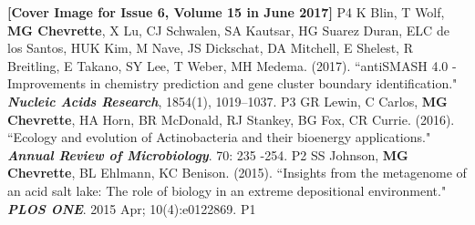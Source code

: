 \begin{cvpubs}
{	\linebreak \textbf{[Cover Image for Issue 6, Volume 15 in June 2017]}    
    } %
    {P4} %
  \cvpub
    {K Blin, T Wolf, \textbf{MG Chevrette}, X Lu, CJ Schwalen, SA Kautsar, HG Suarez Duran, ELC de los Santos, HUK Kim, M Nave, JS Dickschat, DA Mitchell, E Shelest, R Breitling, E Takano, SY Lee, T Weber, MH Medema. (2017). ``antiSMASH 4.0 - Improvements in chemistry prediction and gene cluster boundary identification." \textit{\textbf{Nucleic Acids Research}}, 1854(1), 1019–1037. \textbf{\textit{}} }  %
    {P3} %
  \cvpub
    {GR Lewin, C Carlos, \textbf{MG Chevrette}, HA Horn, BR McDonald, RJ Stankey, BG Fox, CR Currie. (2016). ``Ecology and evolution of Actinobacteria and their bioenergy applications." \textit{\textbf{Annual Review of Microbiology}}. 70: 235 -254. \textbf{\textit{}} } %
    {P2} %
  \cvpub
    {SS Johnson, \textbf{MG Chevrette}, BL Ehlmann, KC Benison. (2015). ``Insights from the metagenome of an acid salt lake: The role of biology in an extreme depositional environment."  \textit{\textbf{PLOS ONE}}. 2015 Apr; 10(4):e0122869. \textbf{\textit{}} } %
    {P1} %
\end{cvpubs}

